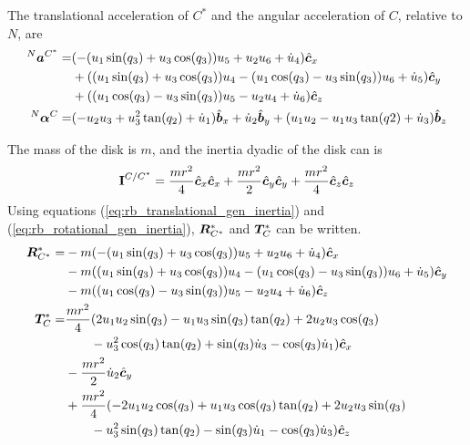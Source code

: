 The translational acceleration of $C^*$ and the angular acceleration of $C$,
relative to $N$, are
\begin{align}
    {^N}\boldsymbol{a}^{C^*} =& (-(u_1 \sin(q_3) + u_3 \cos(q_3)) u_5 + u_2 u_6 +
    \dot{u}_4) \hat{\boldsymbol{c}}_{x} \notag \\
                      & + ((u_1 \sin(q_3) + u_3 \cos(q_3)) u_4 - (u_1
                      \cos(q_3) - u_3 \sin(q_3)) u_6 + \dot{u}_5) \hat{\boldsymbol{c}}_{y}
                         \notag\\
                      & + ((u_1 \cos(q_3) - u_3 \sin(q_3)) u_5 - u_2 u_4 +
                      \dot{u}_6) \hat{\boldsymbol{c}}_{z} \\
                      {^N}\boldsymbol{\alpha}^{C} =& (-u_2 u_3 + u_3^2 \tan(q_2) + \dot{u}_1) \hat{\boldsymbol{b}}_{x}
                      + \dot{u}_2 \hat{\boldsymbol{b}}_{y} + (u_1 u_2 - u_1 u_3 \tan(q2) +
                      \dot{u}_3) \hat{\boldsymbol{b}}_{z}
\end{align}

The mass of the disk is $m$, and the inertia dyadic of the disk can is
\begin{align}
  \boldsymbol{\mathbf{I}}^{C/C^*} = \frac{m r^2}{4} \hat{\boldsymbol{c}}_{x}\hat{\boldsymbol{c}}_{x} +
    \frac{m r^2}{2} \hat{\boldsymbol{c}}_{y}\hat{\boldsymbol{c}}_{y} + \frac{m r^2}{4} \hat{\boldsymbol{c}}_{z}\hat{\boldsymbol{c}}_{z}
\end{align}
Using equations (\ref{eq:rb_translational_gen_inertia}) and
(\ref{eq:rb_rotational_gen_inertia}), $\boldsymbol{R}^*_{C^*}$ and $\boldsymbol{T}^*_C$ can be
written.
\begin{align}
    \boldsymbol{R}^*_{C^*} =& - m (- (u_{1} \sin(q_{3}) + u_{3}
                       \cos(q_{3})) u_{5} + u_{2} u_{6} +
                       \dot{u}_{4}) \hat{\boldsymbol{c}}_{x} \notag \\
                     & - m ((u_{1} \sin(q_{3}) + u_{3}
                       \cos(q_{3})) u_{4} - (u_{1}
                       \cos(q_{3}) - u_{3}
                       \sin(q_{3})) u_{6} + \dot{u}_{5})
                       \hat{\boldsymbol{c}}_{y} \notag \\
                     & - m ((u_{1} \cos(q_{3}) - u_{3}
                       \sin(q_{3})) u_{5} - u_{2} u_{4} +
                   \dot{u}_{6}) \hat{\boldsymbol{c}}_{z} \\
    \boldsymbol{T}^*_C =& \frac{m r^{2}}{4} (2 u_{1} u_{2} \sin(q_{3})
                   - u_{1} u_{3} \sin(q_{3}) \tan(q_{2})
                   + 2 u_{2} u_{3} \cos(q_{3}) \notag\\&\quad\quad- u_{3}^2
                   \cos(q_{3}) \tan(q_{2}) +
                   \sin(q_{3}) \dot{u}_{3} - \cos(q_{3})
                   \dot{u}_{1}) \hat{\boldsymbol{c}}_{x} \notag \\
                 & - \frac{m r^{2}}{2} \dot{u}_{2} \hat{\boldsymbol{c}}_{y} \notag \\
                 & + \frac{m r^{2}}{4} (- 2 u_{1} u_{2}
                   \cos(q_{3}) + u_{1} u_{3} \cos(q_{3})
                   \tan(q_{2}) + 2 u_{2} u_{3}
                   \sin(q_{3}) \notag\\&\quad\quad - u_{3}^2 \sin(q_{3})
                   \tan(q_{2}) - \sin(q_{3}) \dot{u}_{1}
                   - \cos(q_{3}) \dot{u}_{3}) \hat{\boldsymbol{c}}_{z}
\end{align}

